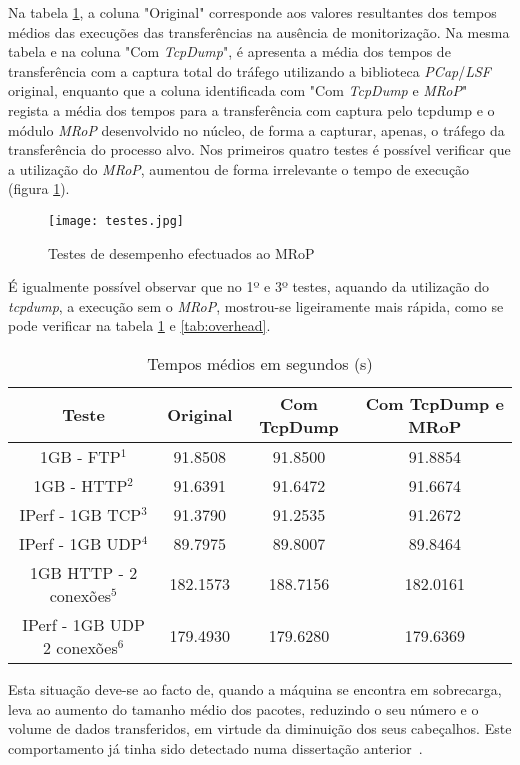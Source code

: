 Na tabela \ref{tab:desempenho}, a coluna "Original" corresponde aos valores resultantes dos tempos médios das execuções das transferências na ausência de monitorização.
Na mesma tabela e na coluna "Com \textit{TcpDump}", é apresenta a média dos tempos de transferência com a captura total do tráfego utilizando a biblioteca \textit{PCap}/\textit{LSF} original, enquanto que a coluna identificada com "Com \textit{TcpDump} e \textit{MRoP}" regista a média dos tempos para a transferência com captura pelo tcpdump e o módulo \textit{MRoP} desenvolvido no núcleo, de forma a capturar, apenas, o tráfego da transferência do processo alvo.
Nos primeiros quatro testes é possível verificar que a utilização do \textit{MRoP}, aumentou de forma irrelevante o tempo de execução (figura \ref{fig:tests_graphics}).

\begin{figure}[!htbp]
\centering
\texttt{[image: testes.jpg]}
\caption{Testes de desempenho efectuados ao MRoP}
\label{fig:tests_graphics}
\end{figure}

É igualmente possível observar que no 1º e 3º testes, aquando da utilização do \textit{tcpdump}, a execução sem o \textit{MRoP}, mostrou-se ligeiramente mais rápida, como se pode verificar na tabela \ref{tab:desempenho} e \ref{tab:overhead}.
\begin{table}[!htb]
\begin{center}
\caption{Tempos médios em segundos (s)}
\begin{tabular}{ | c | c | c | c |  }
\hline
Teste & \hspace {0.3cm} Original \hspace {0.3cm}& \hspace {0.2cm} Com TcpDump \hspace {0.2cm} & Com TcpDump e MRoP \\
\hline
1GB - FTP$^{1}$ & 91.8508	& 91.8500 & 91.8854 \\
1GB - HTTP$^{2}$ & 91.6391 & 91.6472 & 91.6674 \\ 
IPerf - 1GB TCP$^{3}$ & 91.3790	& 91.2535	& 91.2672 \\
IPerf - 1GB UDP$^{4}$ & 89.7975 & 89.8007 & 89.8464 \\
\hline
\hline
1GB HTTP - 2 conexões$^{5}$ & 182.1573 & 188.7156 & 182.0161 \\
IPerf - 1GB UDP 2 conexões$^{6}$ & 179.4930 & 179.6280 & 179.6369 \\
\hline
\end{tabular}
\label{tab:desempenho}
\end{center}
\end{table}
Esta situação deve-se ao facto de, quando a máquina se encontra em sobrecarga, leva ao aumento do tamanho médio dos pacotes, reduzindo o seu número e o volume de dados transferidos, em virtude da diminuição dos seus cabeçalhos.
Este comportamento já tinha sido detectado numa dissertação anterior~\cite{Farruca:2009}.

